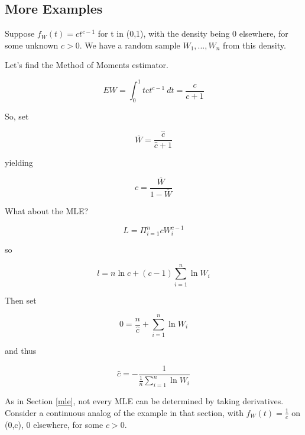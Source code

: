 \subsection{More Examples}

Suppose $f_W(t) = ct^{c-1}$ for t in (0,1), with the density
being 0 elsewhere, for some unknown $c > 0$.  We have a random sample
$W_1,...,W_n$ from this density.  

Let's find the Method of Moments estimator.

\begin{equation}
EW = \int_{0}^{1} t ct^{c-1}~ dt = \frac{c}{c+1}
\end{equation}

So, set

\begin{equation}
\overline{W} = \frac{\widehat{c}}{\widehat{c}+1}
\end{equation}

yielding

\begin{equation}
\label{chatmom}
\widehat{c} = \frac{\overline{W}}{1-\overline{W}}
\end{equation}

What about the MLE?

\begin{equation}
L = \Pi_{i=1}^n c W_i^{c-1} 
\end{equation} 

so

\begin{equation}
l = n \ln{c} + (c-1) \sum_{i=1}^{n} \ln{W_i}
\end{equation}

Then set

\begin{equation}
0 = \frac{n}{\widehat{c}} + \sum_{i=1}^{n} \ln{W_i}
\end{equation}

and thus

\begin{equation}
\label{widehatc}
\widehat{c} = -\frac{1}{\frac{1}{n} \sum_{i=1}^{n} \ln{W_i}}
\end{equation}

% 

As in Section \ref{mle}, not every MLE can be determined by taking
derivatives.  Consider a continuous analog of the example in that
section, with $f_W(t) = \frac{1}{c}$ on (0,c), 0 elsewhere, for some
$c > 0$. 

